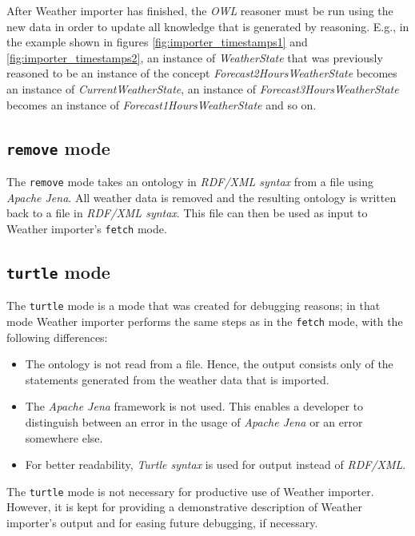 After Weather importer has finished, the \emph{OWL} reasoner must be run using the new data in order to update all knowledge that is generated by reasoning. E.g., in the example shown in figures \ref{fig:importer_timestamps1} and \ref{fig:importer_timestamps2}, an instance of \emph{WeatherState} that was previously reasoned to be an instance of the concept \emph{Forecast2HoursWeatherState} becomes an instance of \emph{CurrentWeatherState}, an instance of \emph{Forecast3HoursWeatherState} becomes an instance of \emph{Forecast1HoursWeatherState} and so on.

\subsection{\texttt{remove} mode}

The \texttt{remove} mode takes an ontology in \emph{RDF/XML syntax} from a file using \emph{Apache Jena}. All weather data is removed and the resulting ontology is written back to a file in \emph{RDF/XML syntax}. This file can then be used as input to Weather importer's \texttt{fetch} mode.

\subsection{\texttt{turtle} mode}
\label{subsec:importer_turtle}

The \texttt{turtle} mode is a mode that was created for debugging reasons; in that mode Weather importer performs the same steps as in the \texttt{fetch} mode, with the following differences:
\begin{itemize}
  \item The \thinkhomeweather ontology is not read from a file. Hence, the output consists only of the statements generated from the weather data that is imported.
  \item The \emph{Apache Jena} framework is not used. This enables a developer to distinguish between an error in the usage of \emph{Apache Jena} or an error somewhere else.
  \item For better readability, \emph{Turtle syntax} is used for output instead of \emph{RDF/XML}.
\end{itemize}

The \texttt{turtle} mode is not necessary for productive use of Weather importer. However, it is kept for providing a demonstrative description of Weather importer's output and for easing future debugging, if necessary.



